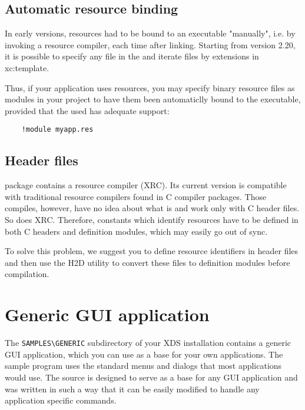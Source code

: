 \subsection{Automatic resource binding}

In early \XDS{} versions, resources had to be bound to an executable
"manually", i.e. by invoking a resource compiler, each time after linking.
Starting from version 2.20, it is possible to specify any file in
the 
and iterate files by extensions in 
{}{xc:template}.

Thus, if your application uses resources, you may specify
binary resource files as modules in your project to have them
been automaticlly bound to the executable, provided that
the used  has adequate support:

\verb'    !module myapp.res'

\subsection{Header files}

\XDS{} package contains a resource compiler (XRC). Its current version
is compatible with traditional resource compilers found in C compiler
packages. Those compiles, however, have no idea about what
\mt{} is and work only with C header files. So does XRC.
Therefore, constants which identify resources have to be defined in
both C headers and \mt{} definition modules, which may
easily go out of sync.

To solve this problem, we suggest you to define resource identifiers
in header files and then use the H2D utility to convert these %
files to definition modules before compilation.

\section{Generic GUI application}

The \verb'SAMPLES\GENERIC' subdirectory of your XDS installation contains
a generic GUI application, which you can use as
a base for your own applications. The sample program uses the
standard menus and dialogs that most applications would use.
The source is designed to serve as a base for any GUI
application and was written in such a way that it can be
easily modified to handle any application specific commands.

